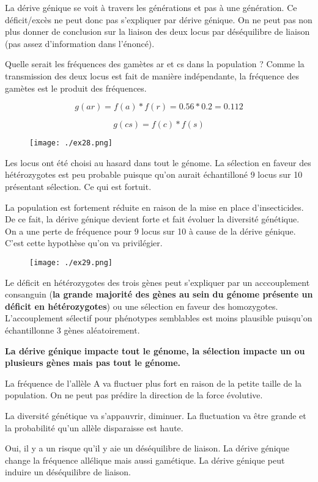 \documentclass{article}
\begin{document}
La dérive génique se voit à travers les générations et pas à une génération. Ce déficit/excès ne peut donc pas s'expliquer par dérive génique. On ne peut pas non plus donner de conclusion sur la liaison des deux locus par déséquilibre de liaison (pas assez d'information dans l'énoncé).


Quelle serait les fréquences des gamètes ar et cs dans la population ?
Comme la transmission des deux locus est fait de manière indépendante, la fréquence des gamètes est le produit des fréquences.

\begin{equation}
g(ar) = f(a)*f(r) = 0.56*0.2 = 0.112
\end{equation}

\begin{equation}
g(cs) = f(c)*f(s)
\end{equation}

\pagebreak

\begin{figure}[H]
\texttt{[image: ./ex28.png]}
\end{figure}

Les locus ont été choisi au hasard dans tout le génome. La sélection en faveur des hétérozygotes est peu probable puisque qu'on aurait échantilloné 9 locus sur 10 présentant sélection. Ce qui est fortuit.

La population est fortement réduite en raison de la mise en place d'insecticides. De ce fait, la dérive génique devient forte et fait évoluer la diversité génétique. On a une perte de fréquence pour 9 locus sur 10 à cause de la dérive génique. C'est cette hypothèse qu'on va privilégier.

\pagebreak

\begin{figure}[H]
\texttt{[image: ./ex29.png]}
\end{figure}

Le déficit en hétérozygotes des trois gènes peut s'expliquer par un acccouplement consanguin (\textbf{la grande majorité des gènes au sein du génome présente un déficit en hétérozygotes}) ou une sélection en faveur des homozygotes. L'accouplement sélectif pour phénotypes semblables est moins plausible puisqu'on échantillonne 3 gènes aléatoirement.

\textbf{La dérive génique impacte tout le génome, la sélection impacte un ou plusieurs gènes mais pas tout le génome.}

La fréquence de l'allèle A va fluctuer plus fort en raison de la petite taille de la population. On ne peut pas prédire la direction de la force évolutive.

La diversité génétique va s'appauvrir, diminuer. La fluctuation va être grande et la probabilité qu'un allèle disparaisse est haute.

Oui, il y a un risque qu'il y aie un déséquilibre de liaison. La dérive génique change la fréquence allélique mais aussi gamétique. La dérive génique peut induire un déséquilibre de liaison.
\end{document}
